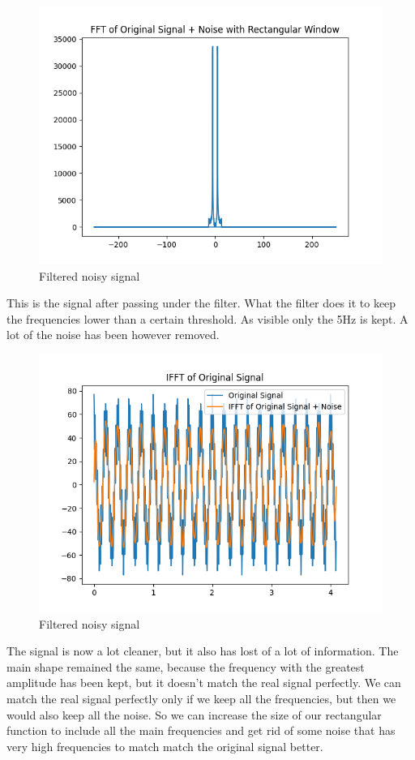 \documentclass{article}
\begin{document}
\begin{figure}[H]
    \includegraphics[width=\textwidth]{HW2_2freq_55points.png}
    \caption{Filtered noisy signal}
\end{figure}
This is the signal after passing under the filter. What the filter does it to keep the frequencies lower than a certain threshold. As visible only the 5Hz is kept. 
A lot of the noise has been however removed. \\
\begin{figure}[H]
    \includegraphics[width=\textwidth]{HW2_2IFFT_55points.png}
    \caption{Filtered noisy signal}
\end{figure}
The signal is now a lot cleaner, but it also has lost of a lot of information. The main shape remained the same, because the frequency with the greatest amplitude has been kept, but it doesn't match the real signal perfectly. 
We can match the real signal perfectly only if we keep all the frequencies, but then we would also keep all the noise. So we can increase the size of our rectangular function to include all the main frequencies and get rid of some noise that has very high frequencies to match match the original signal better. \\
\end{document}
